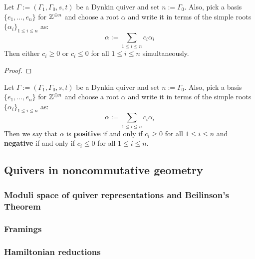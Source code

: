             \begin{lemma} \label{lemma: roots_are_exclusively_either_negative_or_positive}
                Let $\Gamma := (\Gamma_1, \Gamma_0, s, t)$ be a Dynkin quiver and set $n := \Gamma_0$. Also, pick a basis $\{e_1, ..., e_n\}$ for $\mathbb{Z}^{\oplus n}$ and choose a root $\alpha$ and write it in terms of the simple roots $\{\alpha_i\}_{1 \leq i \leq n}$ as:
                    $$\alpha := \sum_{1 \leq i \leq n} c_i \alpha_i$$
                Then either $c_i \geq 0$ or $c_i \leq 0$ for all $1 \leq i \leq n$ simultaneously.
            \end{lemma}
                \begin{proof}
                    
                \end{proof}
            \begin{definition} \label{def: negative_and_positive_roots}
                Let $\Gamma := (\Gamma_1, \Gamma_0, s, t)$ be a Dynkin quiver and set $n := \Gamma_0$. Also, pick a basis $\{e_1, ..., e_n\}$ for $\mathbb{Z}^{\oplus n}$ and choose a root $\alpha$ and write it in terms of the simple roots $\{\alpha_i\}_{1 \leq i \leq n}$ as:
                    $$\alpha := \sum_{1 \leq i \leq n} c_i \alpha_i$$
                Then we say that $\alpha$ is \textbf{positive} if and only if $c_i \geq 0$ for all $1 \leq i \leq n$ and \textbf{negative} if and only if $c_i \leq 0$ for all $1 \leq i \leq n$.
            \end{definition}
            \begin{example}
                
            \end{example}
        
    \subsection{Quivers in noncommutative geometry}
        \subsubsection{Moduli space of quiver representations and Beilinson's Theorem}
        
        \subsubsection{Framings}
        
        \subsubsection{Hamiltonian reductions}